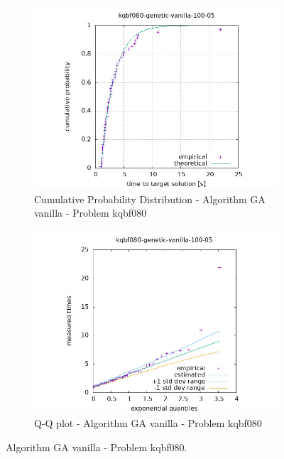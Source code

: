 \begin{figure}[H]
    \centering
    \begin{subfigure}{0.49\textwidth}
        \includegraphics[width=\textwidth]{figure/ttt_plot/kqbf080-genetic-vanilla-100-05-exp.jpeg}
        \caption{Cumulative Probability Distribution - Algorithm GA vanilla - Problem kqbf080}
        \label{fig:ga-vanilla-kqbf080-exp}
    \end{subfigure}
    \hfill
    \begin{subfigure}{0.49\textwidth}
        \includegraphics[width=\textwidth]{figure/ttt_plot/kqbf080-genetic-vanilla-100-05-qq.jpeg}
        \caption{Q-Q plot - Algorithm GA vanilla - Problem kqbf080}
        \label{fig:ga-vanilla-kqbf080-qq}
    \end{subfigure}
    \caption{Algorithm GA vanilla - Problem kqbf080.}
    \label{fig:ga-vanilla-kqbf080}
\end{figure}


